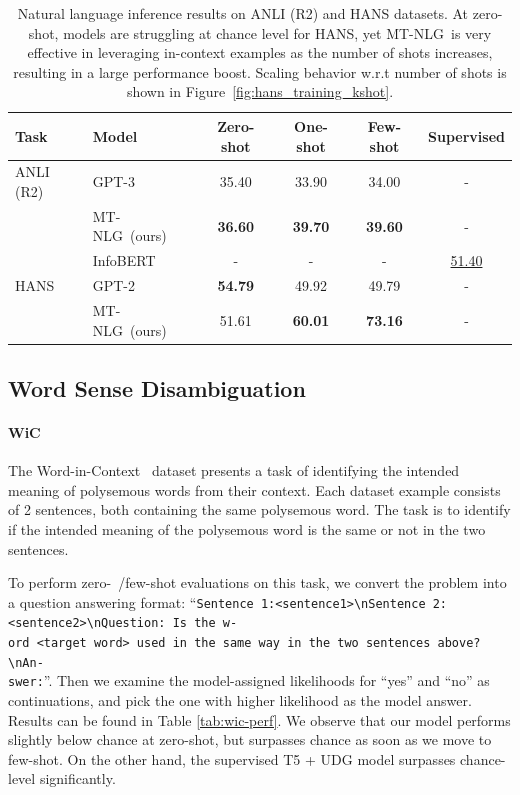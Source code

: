 \documentclass[11pt]{article}
\newcommand{\ours}{MT-NLG}
\begin{document}
\begin{table}[t]
\centering
\small
\begin{tabular}{l l c c c c}
 \toprule
 \textbf{Task} & \textbf{Model} &  \textbf{Zero-shot}  &  \textbf{One-shot} &  \textbf{Few-shot} & \textbf{Supervised} \\
 \midrule
 ANLI (R2) & GPT-3	&	35.40	&	33.90	&	34.00 & -	\\
           & \ours~(ours)  &   \textbf{36.60}   &   \textbf{39.70}   &   \textbf{39.60} & -  \\
           \cmidrule{2-6}
           & InfoBERT & - & - & - & \underline{51.40} \\
 \midrule
 HANS & GPT-2 & \textbf{54.79}   &   49.92   &   49.79 & - \\
      & \ours~(ours) & {51.61}	&	\textbf{60.01}	&	\textbf{73.16} & -	\\
 \bottomrule
\end{tabular}
\caption{Natural language inference results on ANLI (R2) and HANS datasets. At zero-shot, models are struggling at chance level for HANS, yet \ours~is very effective in leveraging in-context examples as the number of shots increases, resulting in a large performance boost. Scaling behavior w.r.t number of shots is shown in Figure~\ref{fig:hans_training_kshot}.
}
\label{tab:nli-perf}
\end{table}

\subsection{Word Sense Disambiguation}

\paragraph{WiC} The Word-in-Context~\citep{Pilehvar2019WiCTW} dataset presents a task of identifying the intended meaning of polysemous words from their context. Each dataset example consists of 2 sentences, both containing the same polysemous word. The task is to identify if the intended meaning of the polysemous word is the same or not in the two sentences.

To perform zero-~/few-shot evaluations on this task, we convert the problem into a question answering format: ``\texttt{Sentence 1:<sentence1>\textbackslash nSentence 2:<sentence2>\textbackslash nQuestion: Is the w-\\ord <target word> used in the same way in the two sentences above?\textbackslash nAn-\\swer:}''. Then we examine the model-assigned likelihoods for ``yes'' and ``no'' as continuations, and pick the one with higher likelihood as the model answer. Results can be found in Table \ref{tab:wic-perf}. We observe that our model performs slightly below chance at zero-shot, but surpasses chance as soon as we move to few-shot. On the other hand, the supervised T5 + UDG model surpasses chance-level significantly.
\end{document}
